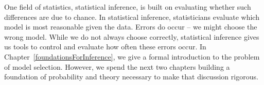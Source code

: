 One field of statistics, statistical inference, is built on evaluating whether such differences are due to chance. In statistical inference, statisticians evaluate which model is most reasonable given the data. Errors do occur -- we might choose the wrong model. While we do not always choose correctly, statistical inference gives us tools to control and evaluate how often these errors occur. In Chapter~\ref{foundationsForInference}, we give a formal introduction to the problem of model selection. However, we spend the next two chapters building a foundation of probability and theory necessary to make that discussion rigorous.



